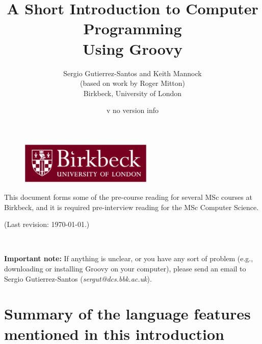 \documentclass[11pt,a4paper]{article}
\title{A Short Introduction to Computer Programming\\
  Using Groovy}
\author{Sergio Gutierrez-Santos and Keith Mannock\\
  (based on work by Roger Mitton)\\
  Birkbeck, University of London}
\date{\InputIfFileExists{version.txt}
     {v}
     {no version info}}
\begin{document}

\maketitle
\thispagestyle{empty}

\vfill 

\begin{figure}[h!]  %
  \centering
  \includegraphics[height=2cm]{bbk.eps}
\end{figure}

\vfill

\noindent This document forms some of the pre-course reading for
several MSc courses at Birkbeck, and it is required pre-interview
reading for the MSc Computer Science.


\noindent (Last revision: \today.)


\newpage

~\vspace{8cm}

\textbf{Important note: } If anything is unclear, or you have any 
sort of problem (e.g.,
downloading or installing Groovy on your computer), please send an
email to Sergio Gutierrez-Santos (\emph{sergut@dcs.bbk.ac.uk}).
\newpage


\newpage


\newpage


\newpage


\newpage


\newpage

\section{Summary of the language features mentioned in this introduction}

\newpage


\end{document}
